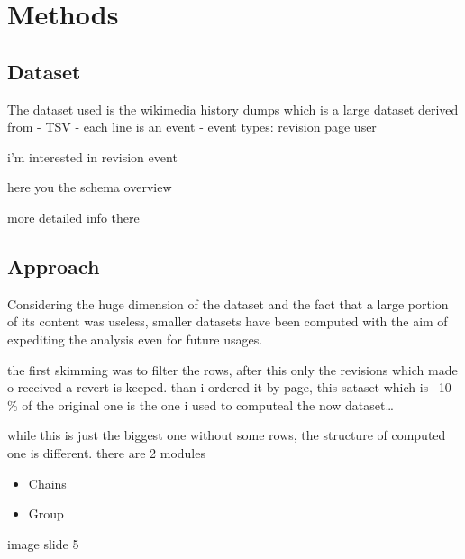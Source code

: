 \chapter{Methods}
\section{Dataset }
The dataset used is the wikimedia history dumps which is a large dataset derived from 
- TSV 
- each line is an event
- event types: revision page user 

i'm interested in revision event 

here you the schema overview 

more detailed info there 


\section{Approach}
Considering the huge dimension of the dataset and the fact that a large portion of its content was useless, 
smaller datasets have been computed with the aim of expediting the analysis even for future usages.

the first skimming was to filter the rows, after this only the revisions which made o received a revert is keeped.
than i ordered it by page, this sataset which is ~10 \% of the original one is the one i used to computeal the now dataset\dots

while this is just the biggest one without some rows, the structure of computed one is different. there are 2 modules
\begin{itemize}
    \item Chains
    \item Group 
\end{itemize}

image slide 5 

